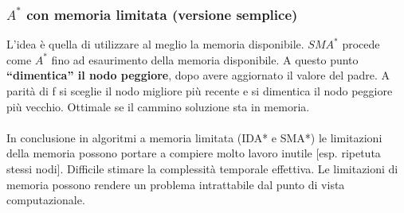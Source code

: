 \subsubsection{$A^*$ con memoria limitata (versione semplice)}
L'idea è quella di utilizzare al meglio la memoria disponibile. $SMA^*$ procede come $A^*$ fino ad esaurimento della
memoria disponibile. A questo punto \textbf{“dimentica” il nodo peggiore}, dopo avere aggiornato il valore del padre.
A parità di f si sceglie il nodo migliore più recente e si dimentica il nodo peggiore più vecchio. Ottimale se il cammino soluzione sta in memoria.\\\\
In conclusione in algoritmi a memoria limitata (IDA* e SMA*) le limitazioni della memoria possono portare a compiere
molto lavoro inutile [esp. ripetuta stessi nodi]. Difficile stimare la complessità temporale effettiva. Le limitazioni di memoria possono rendere un problema intrattabile dal punto di vista computazionale.